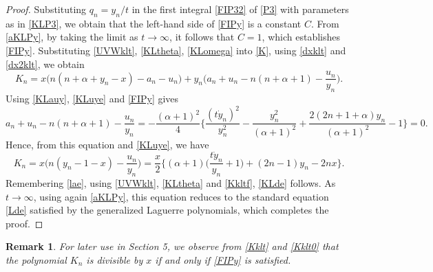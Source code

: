 \documentclass[10pt, reqno]{amsart}
\numberwithin{equation}{section}
\newtheorem{remark}{Remark}[section]
\numberwithin{equation}{section}
\begin{document}
\begin{proof} 
Substituting $q_n=y_n/t$ in the first integral \eqref{FIP32} of \eqref{P3} with parameters as in \eqref{KLP3}, we obtain that the left-hand side of \eqref{FIPy} is a constant $C$. From \eqref{aKLPy}, by taking the limit as $t\to\infty$, it follows that $C=1$, which establishes \eqref{FIPy}. Substituting \eqref{UVWklt}, \eqref{KLtheta}, \eqref{KLomega} into \eqref{K}, using \eqref{dxklt} and \eqref{dx2klt}, we obtain
\begin{equation}
K_n=x\big(n(n+\alpha+y_n-x)-a_n-u_n\big)+y_n\Big(a_n+u_n-n(n+\alpha+1)-\frac{u_n}{y_n}\Big).\label{Kklt}
\end{equation}
Using \eqref{KLauy}, \eqref{KLuye} and \eqref{FIPy} gives
\begin{equation}
a_n+u_n-n(n+\alpha+1)-\frac{u_n}{y_n}=-\frac{(\alpha+1)^2}{4}\Big\{\frac{(t\dot{y}_n)^2}{y_n^2}-\frac{y_n^2}{(\alpha+1)^2}+\frac{2(2n+1+\alpha)y_n}{(\alpha+1)^2}-1\Big\}=0.\label{Kklt0}
\end{equation} 
Hence, from this equation and \eqref{KLuye}, we have
\begin{equation}
K_n=x\Big(n(y_n-1-x)-\frac{u_n}{y_n}\Big)=\frac{x}{2}\Big\{(\alpha+1)\Big(\frac{t\dot{y}_n}{y_n}+1\Big)+(2n-1)y_n-2nx\Big\}.\label{Kkltf}
\end{equation}
Remembering \eqref{lae}, using \eqref{UVWklt}, \eqref{KLtheta} and \eqref{Kkltf}, \eqref{KLde} follows. As $t\to\infty$, using again \eqref{aKLPy}, this equation reduces to the standard equation \eqref{Lde} satisfied by the generalized Laguerre polynomials, which completes the proof.
\end{proof}
\begin{remark} \label{remark 3.2}
\emph{For later use in Section 5, we observe from \eqref{Kklt} and \eqref{Kklt0} that the polynomial $K_n$ is divisible by $x$ if and only if \eqref{FIPy} is satisfied.}
\end{remark} 
\end{document}
